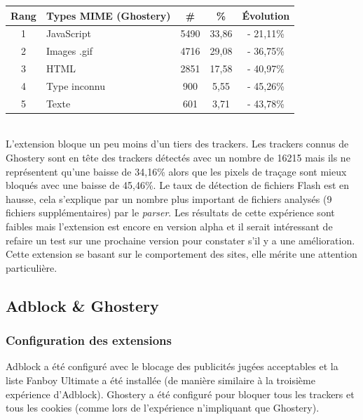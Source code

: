 \begin{tabular}{ c | p{5cm} | c | c | c | }
   Rang & Types MIME (Ghostery) & \# & \% & Évolution\\
   \hline
   \hline
   1 & JavaScript & 5490 & 33,86 & - 21,11\% \\
   2 & Images .gif & 4716 & 29,08 & - 36,75\% \\
   3 & HTML & 2851 & 17,58 & - 40,97\% \\
   4 & Type inconnu & 900 & 5,55 & - 45,26\% \\
   5 & Texte & 601 & 3,71 & - 43,78\% \\
   \hline
\end{tabular}
\\[.3cm]

L'extension bloque un peu moins d'un tiers des trackers. Les trackers connus de Ghostery sont en tête des trackers détectés avec un nombre de 16215 mais ils ne représentent qu'une baisse de 34,16\% alors que les pixels de traçage sont mieux bloqués avec une baisse de 45,46\%. Le taux de détection de fichiers Flash est en hausse, cela s'explique par un nombre plus important de fichiers analysés (9 fichiers supplémentaires) par le \textit{parser}. Les résultats de cette expérience sont faibles mais l'extension est encore en version alpha et il serait intéressant de refaire un test sur une prochaine version pour constater s'il y a une amélioration. Cette extension se basant sur le comportement des sites, elle mérite une attention particulière.


\subsection{Adblock \& Ghostery}
\subsubsection{Configuration des extensions}
Adblock a été configuré avec le blocage des publicités jugées acceptables et la liste Fanboy Ultimate a été installée (de manière similaire à la troisième expérience d'Adblock). Ghostery a été configuré pour bloquer tous les trackers et tous les cookies (comme lors de l'expérience n'impliquant que Ghostery).

